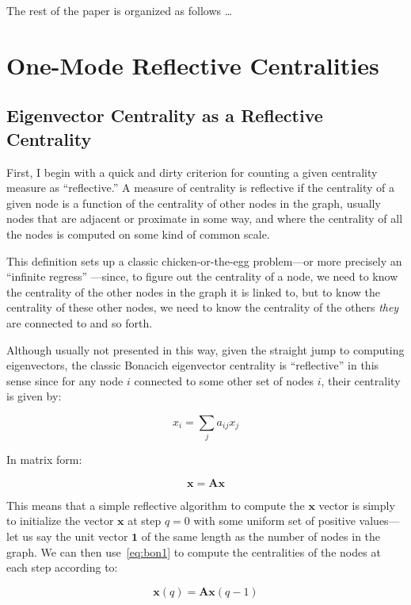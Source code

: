 \documentclass[a4paper,fleqn]{cas-sc}
\begin{document}
The rest of the paper is organized as follows \ldots

\section{One-Mode Reflective Centralities}
\subsection{Eigenvector Centrality as a Reflective Centrality}
First, I begin with a quick and dirty criterion for counting a given centrality measure as ``reflective.'' A measure of centrality is reflective if the centrality of a given node is a function of the centrality of other nodes in the graph, usually nodes that are adjacent or proximate in some way, and where the centrality of all the nodes is computed on some kind of common scale. 

This definition sets up a classic chicken-or-the-egg problem---or more precisely an ``infinite regress'' \citep[234-235]{seeley49}---since, to figure out the centrality of a node, we need to know the centrality of the other nodes in the graph it is linked to, but to know the centrality of these other nodes, we need to know the centrality of the others \textit{they} are connected to and so forth. 

Although usually not presented in this way, given the straight jump to computing eigenvectors, the classic Bonacich eigenvector centrality is ``reflective'' in this sense since for any node $i$ connected to some other set of nodes $i$, their centrality is given by:

\begin{equation}
    x_i = \sum_j a_{ij}x_j
    \label{eq:bon1}
\end{equation}

In matrix form:

\begin{equation}
    \mathbf{x} = \mathbf{A} \mathbf{x}
    \label{eq:bon2}
\end{equation}

This means that a simple reflective algorithm to compute the $\mathbf{x}$ vector is simply to initialize the vector $\mathbf{x}$ at step $q = 0$ with some uniform set of positive values---let us say the unit vector $\mathbf{1}$ of the same length as the number of nodes in the graph. We can then use~\ref{eq:bon1} to compute the centralities of the nodes at each step according to:

\begin{equation}
    \mathbf{x}(q) = \mathbf{A} \mathbf{x}(q - 1)
    \label{eq:bon3}
\end{equation}
\end{document}
